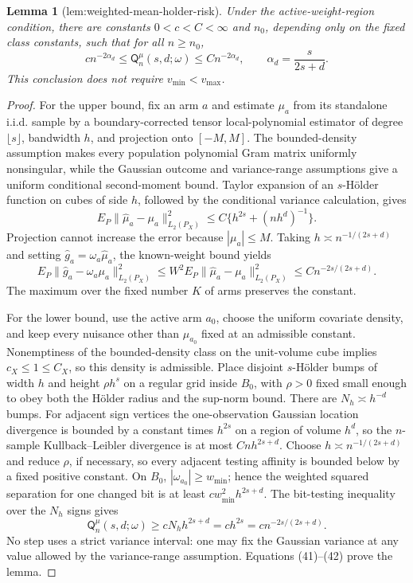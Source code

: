 \documentclass{article}
\newtheorem{lemma}{Lemma}
\begin{document}
\begin{lemma}[lem:weighted-mean-holder-risk]\label{lem:weighted-mean-holder-risk}
Under the active-weight-region condition, there are constants \(0<c<C<\infty\) and \(n_0\), depending only on the fixed class constants, such that for all \(n\geq n_0\),
\[
c n^{-2\alpha_d}
\leq \mathsf Q_n^{\mu}(s,d;\omega)
\leq C n^{-2\alpha_d},
\qquad \alpha_d=\frac{s}{2s+d}.
\]
This conclusion does not require \(v_{\min}<v_{\max}\).
\end{lemma}
\begin{proof}
For the upper bound, fix an arm \(a\) and estimate \(\mu_a\) from its standalone i.i.d. sample by a boundary-corrected tensor local-polynomial estimator of degree \(\lfloor s\rfloor\), bandwidth \(h\), and projection onto \([-M,M]\). The bounded-density assumption makes every population polynomial Gram matrix uniformly nonsingular, while the Gaussian outcome and variance-range assumptions give a uniform conditional second-moment bound. Taylor expansion of an \(s\)-Hölder function on cubes of side \(h\), followed by the conditional variance calculation, gives
\[
E_P\|\widehat\mu_a-\mu_a\|_{L_2(P_X)}^2
\leq C\{h^{2s}+(nh^d)^{-1}\}.
\tag{40}
\]
Projection cannot increase the error because \(|\mu_a|\leq M\). Taking \(h\asymp n^{-1/(2s+d)}\) and setting \(\widehat g_a=\omega_a\widehat\mu_a\), the known-weight bound yields
\[
E_P\|\widehat g_a-\omega_a\mu_a\|_{L_2(P_X)}^2
\leq W^2 E_P\|\widehat\mu_a-\mu_a\|_{L_2(P_X)}^2
\leq C n^{-2s/(2s+d)}.
\tag{41}
\]
The maximum over the fixed number \(K\) of arms preserves the constant.

For the lower bound, use the active arm \(a_0\), choose the uniform covariate density, and keep every nuisance other than \(\mu_{a_0}\) fixed at an admissible constant. Nonemptiness of the bounded-density class on the unit-volume cube implies \(c_X\leq1\leq C_X\), so this density is admissible. Place disjoint \(s\)-Hölder bumps of width \(h\) and height \(\rho h^s\) on a regular grid inside \(B_0\), with \(\rho>0\) fixed small enough to obey both the Hölder radius and the sup-norm bound. There are \(N_h\asymp h^{-d}\) bumps. For adjacent sign vertices the one-observation Gaussian location divergence is bounded by a constant times \(h^{2s}\) on a region of volume \(h^d\), so the \(n\)-sample Kullback--Leibler divergence is at most \(Cnh^{2s+d}\). Choose \(h\asymp n^{-1/(2s+d)}\) and reduce \(\rho\), if necessary, so every adjacent testing affinity is bounded below by a fixed positive constant. On \(B_0\), \(|\omega_{a_0}|\geq w_{\min}\); hence the weighted squared separation for one changed bit is at least \(c w_{\min}^2h^{2s+d}\). The bit-testing inequality over the \(N_h\) signs gives
\[
\mathsf Q_n^{\mu}(s,d;\omega)
\geq cN_hh^{2s+d}
=c h^{2s}
=c n^{-2s/(2s+d)}.
\tag{42}
\]
No step uses a strict variance interval: one may fix the Gaussian variance at any value allowed by the variance-range assumption. Equations (41)--(42) prove the lemma.
\end{proof}
\end{document}

